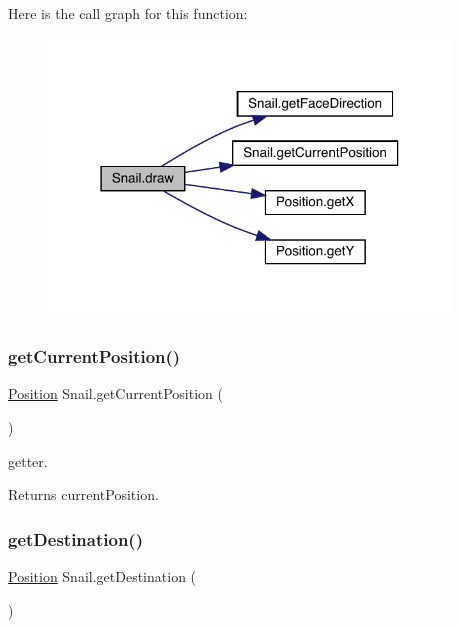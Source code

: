Here is the call graph for this function\+:
\nopagebreak
\begin{figure}[H]
\begin{center}
\leavevmode
\includegraphics[width=303pt]{class_snail_aa39dc71c305e7034af0438f036232e43_cgraph}
\end{center}
\end{figure}
\mbox{\label{class_snail_a0617eb72efb8c5f88cbad6dd5d68dafd}} 
\subsubsection{\texorpdfstring{get\+Current\+Position()}{getCurrentPosition()}}
{\footnotesize\ttfamily \mbox{\hyperlink{class_position}{Position}} Snail.\+get\+Current\+Position (\begin{DoxyParamCaption}{ }\end{DoxyParamCaption})\hspace{0.3cm}{\ttfamily [inline]}}

getter. \begin{DoxyReturn}{Returns}
current\+Position. 
\end{DoxyReturn}
\mbox{\label{class_snail_a20209772994cb11ba8b25e5b70f075b8}} 
\subsubsection{\texorpdfstring{get\+Destination()}{getDestination()}}
{\footnotesize\ttfamily \mbox{\hyperlink{class_position}{Position}} Snail.\+get\+Destination (\begin{DoxyParamCaption}{ }\end{DoxyParamCaption})\hspace{0.3cm}{\ttfamily [inline]}}

